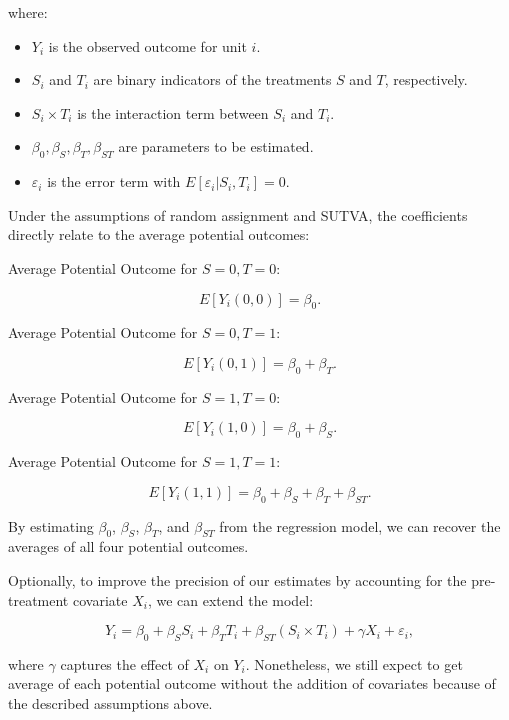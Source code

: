 \documentclass{article}
\begin{document}
where:
\begin{itemize}
  \item \(Y_i\) is the observed outcome for unit \(i\).
  \item \(S_i\) and \(T_i\) are binary indicators of the treatments \(S\) and \(T\), respectively.
  \item \(S_i \times T_i\) is the interaction term between \(S_i\) and \(T_i\).
  \item \(\beta_0, \beta_S, \beta_T, \beta_{ST}\) are parameters to be estimated.
  \item \(\varepsilon_i\) is the error term with \(E[\varepsilon_i | S_i, T_i] = 0\).
\end{itemize}

Under the assumptions of random assignment and SUTVA, the coefficients directly relate to the average potential outcomes:

Average Potential Outcome for \(S=0, T=0\):

   \[
   E[Y_i(0,0)] = \beta_0.
   \]

Average Potential Outcome for \(S=0, T=1\):

   \[
   E[Y_i(0,1)] = \beta_0 + \beta_T.
   \]

Average Potential Outcome for \(S=1, T=0\):

   \[
   E[Y_i(1,0)] = \beta_0 + \beta_S.
   \]

Average Potential Outcome for \(S=1, T=1\):

   \[
   E[Y_i(1,1)] = \beta_0 + \beta_S + \beta_T + \beta_{ST}.
   \]

By estimating \(\beta_0\), \(\beta_S\), \(\beta_T\), and \(\beta_{ST}\) from the regression model, we can recover the averages of all four potential outcomes.

Optionally, to improve the precision of our estimates by accounting for the pre-treatment covariate \(X_i\), we can extend the model:

\[
Y_i = \beta_0 + \beta_S S_i + \beta_T T_i + \beta_{ST} (S_i \times T_i) + \gamma X_i + \varepsilon_i,
\]

where \(\gamma\) captures the effect of \(X_i\) on \(Y_i\). Nonetheless, we still expect to get average of each potential outcome without the addition of covariates because of the described assumptions above.

  
\end{document}

